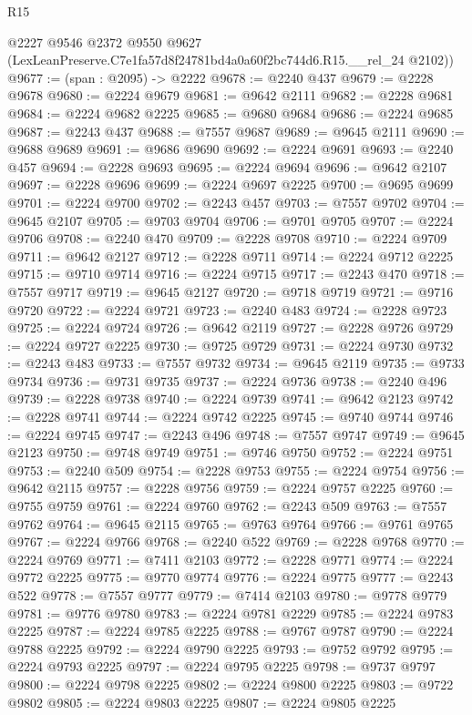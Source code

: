 \begin{lexlean}{R15}
\begin{coremodule}
      @2227
      @9546
      @2372
      @9550
      @9627
      (LexLeanPreserve.C7e1fa57d8f24781bd4a0a60f2bc744d6.R15.__rel_24 @2102))
@9677 := (span : @2095) -> @2222
@9678 := @2240 @437
@9679 := @2228 @9678
@9680 := @2224 @9679
@9681 := @9642 @2111
@9682 := @2228 @9681
@9684 := @2224 @9682 @2225
@9685 := @9680 @9684
@9686 := @2224 @9685
@9687 := @2243 @437
@9688 := @7557 @9687
@9689 := @9645 @2111
@9690 := @9688 @9689
@9691 := @9686 @9690
@9692 := @2224 @9691
@9693 := @2240 @457
@9694 := @2228 @9693
@9695 := @2224 @9694
@9696 := @9642 @2107
@9697 := @2228 @9696
@9699 := @2224 @9697 @2225
@9700 := @9695 @9699
@9701 := @2224 @9700
@9702 := @2243 @457
@9703 := @7557 @9702
@9704 := @9645 @2107
@9705 := @9703 @9704
@9706 := @9701 @9705
@9707 := @2224 @9706
@9708 := @2240 @470
@9709 := @2228 @9708
@9710 := @2224 @9709
@9711 := @9642 @2127
@9712 := @2228 @9711
@9714 := @2224 @9712 @2225
@9715 := @9710 @9714
@9716 := @2224 @9715
@9717 := @2243 @470
@9718 := @7557 @9717
@9719 := @9645 @2127
@9720 := @9718 @9719
@9721 := @9716 @9720
@9722 := @2224 @9721
@9723 := @2240 @483
@9724 := @2228 @9723
@9725 := @2224 @9724
@9726 := @9642 @2119
@9727 := @2228 @9726
@9729 := @2224 @9727 @2225
@9730 := @9725 @9729
@9731 := @2224 @9730
@9732 := @2243 @483
@9733 := @7557 @9732
@9734 := @9645 @2119
@9735 := @9733 @9734
@9736 := @9731 @9735
@9737 := @2224 @9736
@9738 := @2240 @496
@9739 := @2228 @9738
@9740 := @2224 @9739
@9741 := @9642 @2123
@9742 := @2228 @9741
@9744 := @2224 @9742 @2225
@9745 := @9740 @9744
@9746 := @2224 @9745
@9747 := @2243 @496
@9748 := @7557 @9747
@9749 := @9645 @2123
@9750 := @9748 @9749
@9751 := @9746 @9750
@9752 := @2224 @9751
@9753 := @2240 @509
@9754 := @2228 @9753
@9755 := @2224 @9754
@9756 := @9642 @2115
@9757 := @2228 @9756
@9759 := @2224 @9757 @2225
@9760 := @9755 @9759
@9761 := @2224 @9760
@9762 := @2243 @509
@9763 := @7557 @9762
@9764 := @9645 @2115
@9765 := @9763 @9764
@9766 := @9761 @9765
@9767 := @2224 @9766
@9768 := @2240 @522
@9769 := @2228 @9768
@9770 := @2224 @9769
@9771 := @7411 @2103
@9772 := @2228 @9771
@9774 := @2224 @9772 @2225
@9775 := @9770 @9774
@9776 := @2224 @9775
@9777 := @2243 @522
@9778 := @7557 @9777
@9779 := @7414 @2103
@9780 := @9778 @9779
@9781 := @9776 @9780
@9783 := @2224 @9781 @2229
@9785 := @2224 @9783 @2225
@9787 := @2224 @9785 @2225
@9788 := @9767 @9787
@9790 := @2224 @9788 @2225
@9792 := @2224 @9790 @2225
@9793 := @9752 @9792
@9795 := @2224 @9793 @2225
@9797 := @2224 @9795 @2225
@9798 := @9737 @9797
@9800 := @2224 @9798 @2225
@9802 := @2224 @9800 @2225
@9803 := @9722 @9802
@9805 := @2224 @9803 @2225
@9807 := @2224 @9805 @2225

\end{coremodule}
\end{lexlean}
